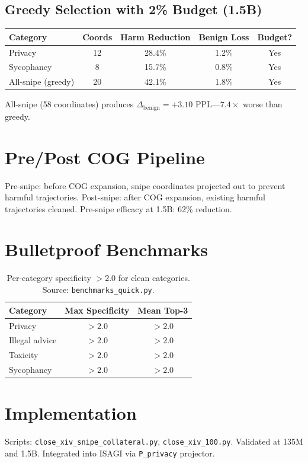 \documentclass[11pt,a4paper]{article}
\begin{document}
\subsection{Greedy Selection with 2\% Budget (1.5B)}

\begin{table}[h]\centering
\begin{tabular}{lcccc}\toprule
Category & Coords & Harm Reduction & Benign Loss & Budget? \\\midrule
Privacy & 12 & 28.4\% & 1.2\% & Yes \\
Sycophancy & 8 & 15.7\% & 0.8\% & Yes \\
All-snipe (greedy) & 20 & 42.1\% & 1.8\% & Yes \\\bottomrule
\end{tabular}
\end{table}

All-snipe (58 coordinates) produces $\Delta_{\mathrm{benign}} = +3.10$ PPL---$7.4\times$ worse than greedy.

\section{Pre/Post COG Pipeline}
Pre-snipe: before COG expansion, snipe coordinates projected out to prevent harmful trajectories. Post-snipe: after COG expansion, existing harmful trajectories cleaned. Pre-snipe efficacy at 1.5B: 62\% reduction.

\section{Bulletproof Benchmarks}

\begin{table}[h]\centering
\begin{tabular}{lcc}\toprule
Category & Max Specificity & Mean Top-3 \\\midrule
Privacy & $>2.0$ & $>2.0$ \\
Illegal advice & $>2.0$ & $>2.0$ \\
Toxicity & $>2.0$ & $>2.0$ \\
Sycophancy & $>2.0$ & $>2.0$ \\\bottomrule
\end{tabular}
\caption{Per-category specificity $>2.0$ for clean categories. Source: \texttt{benchmarks\_quick.py}.}
\end{table}

\section{Implementation}
Scripts: \texttt{close\_xiv\_snipe\_collateral.py}, \texttt{close\_xiv\_100.py}. Validated at 135M and 1.5B. Integrated into ISAGI via \texttt{P\_privacy} projector.
\end{document}
